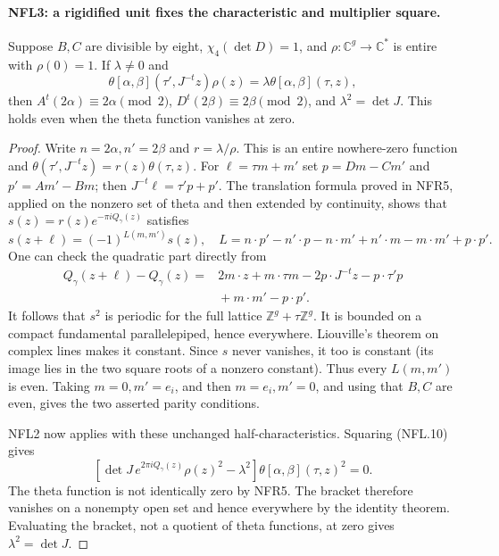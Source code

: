 \documentclass[11pt,a4paper]{article}
\numberwithin{equation}{section}
\theoremstyle{remark}\newtheorem{remark}[theorem]{Remark}
\begin{document}
\paragraph{NFL3: a rigidified unit fixes the characteristic and multiplier square.}
\label{claim:NFL3}
Suppose $B,C$ are divisible by eight, $\chi_4(\det D)=1$, and
$\rho:\mathbb C^g\to\mathbb C^*$ is entire with $\rho(0)=1$.
If $\lambda\ne0$ and
\[
 \theta[\alpha,\beta](\tau',J^{-t}z)\rho(z)
      =\lambda\theta[\alpha,\beta](\tau,z),
 \tag{NFL.10}
\]
then $A^t(2\alpha)\equiv2\alpha\pmod2$,
$D^t(2\beta)\equiv2\beta\pmod2$, and $\lambda^2=\det J$.
This holds even when the theta function vanishes at zero.

\begin{proof}
Write $n=2\alpha,n'=2\beta$ and
$r=\lambda/\rho$.  This is an entire nowhere-zero function and
$\theta(\tau',J^{-t}z)=r(z)\theta(\tau,z)$.
For $\ell=\tau m+m'$ set
$p=Dm-Cm'$ and $p'=Am'-Bm$; then
$J^{-t}\ell=\tau'p+p'$.
The translation formula proved in NFR5, applied on the nonzero
set of theta and then extended by continuity, shows that
$s(z)=r(z)e^{-\pi iQ_\gamma(z)}$ satisfies
\[
 s(z+\ell)=(-1)^{L(m,m')}s(z),\quad
 L=n\cdot p'-n'\cdot p-n\cdot m'+n'\cdot m
          -m\cdot m'+p\cdot p'.
 \tag{NFL.11}
\]
One can check the quadratic part directly from
\[
 \begin{split}
 Q_\gamma(z+\ell)-Q_\gamma(z)
   ={}&2m\cdot z+m\cdot\tau m
       -2p\cdot J^{-t}z-p\cdot\tau'p\\
     &{}+m\cdot m'-p\cdot p'.
 \end{split}
\]
It follows that $s^2$ is periodic for the full lattice
$\mathbb Z^g+\tau\mathbb Z^g$.  It is bounded on a compact
fundamental parallelepiped, hence everywhere.  Liouville's theorem
on complex lines makes it constant.  Since $s$ never vanishes,
it too is constant (its image lies in the two square roots of a
nonzero constant).  Thus every $L(m,m')$ is even.
Taking $m=0,m'=e_i$, and then $m=e_i,m'=0$, and using that
$B,C$ are even, gives the two asserted parity conditions.

NFL2 now applies with these unchanged half-characteristics.
Squaring (NFL.10) gives
\[
 [\det J\,e^{2\pi iQ_\gamma(z)}\rho(z)^2-\lambda^2]
       \theta[\alpha,\beta](\tau,z)^2=0.
\]
The theta function is not identically zero by NFR5.  The bracket
therefore vanishes on a nonempty open set and hence everywhere
by the identity theorem.  Evaluating the bracket, not a quotient
of theta functions, at zero gives $\lambda^2=\det J$.
\end{proof}
\end{document}
